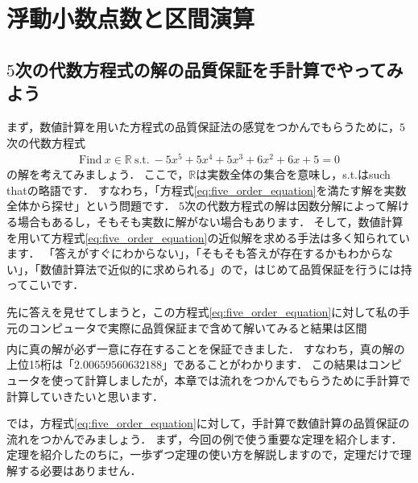 \chapter{浮動小数点数と区間演算} \label{chap:interval}


%
\section{\texorpdfstring{$5$}{5}次の代数方程式の解の品質保証を手計算でやってみよう}\label{sec:5nonlinear}
まず，数値計算を用いた方程式の品質保証法の感覚をつかんでもらうために，$5$次の代数方程式
\begin{align}
	\label{eq:five_order_equation}
	\mbox{Find} ~ x \in {\mathbb R} ~ \mbox{s.t.} ~ -5 x^5 + 5 x^4 + 5 x^3 + 6 x^2 + 6x + 5  = 0
\end{align}
の解を考えてみましょう．
ここで，${\mathbb R}$は実数全体の集合を意味し，s.t.はsuch thatの略語です．
すなわち，「方程式\eqref{eq:five_order_equation}を満たす解を実数全体から探せ」という問題です．
$5$次の代数方程式の解は因数分解によって解ける場合もあるし，そもそも実数に解がない場合もあります．
そして，数値計算を用いて方程式\eqref{eq:five_order_equation}の近似解を求める手法は多く知られています．
「答えがすぐにわからない」，「そもそも答えが存在するかもわからない」，「数値計算法で近似的に求められる」ので，はじめて品質保証を行うには持ってこいです．

先に答えを見せてしまうと，この方程式\eqref{eq:five_order_equation}に対して私の手元のコンピュータで実際に品質保証まで含めて解いてみると結果は区間
\begin{align*}
[ \underbar{2.00659560632188}6, \underbar{2.00659560632188}8]
\end{align*}
内に真の解が必ず一意に存在することを保証できました．
すなわち，真の解の上位15桁は「$2.00659560632188$」であることがわかります．
この結果はコンピュータを使って計算しましたが，本章では流れをつかんでもらうために手計算で計算していきたいと思います．


では，方程式\eqref{eq:five_order_equation}に対して，手計算で数値計算の品質保証の流れをつかんでみましょう．
まず，今回の例で使う重要な定理を紹介します．
定理を紹介したのちに，一歩ずつ定理の使い方を解説しますので，定理だけで理解する必要はありません．

